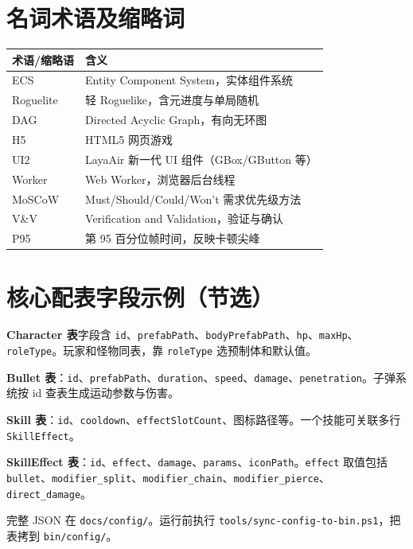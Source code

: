 \chapter{名词术语及缩略词}
\label{app:terms}

\begin{longtable}{ll}
  \toprule
  \textbf{术语/缩略语} & \textbf{含义} \\
  \midrule
  ECS & Entity Component System，实体组件系统 \\
  Roguelite & 轻 Roguelike，含元进度与单局随机 \\
  DAG & Directed Acyclic Graph，有向无环图 \\
  H5 & HTML5 网页游戏 \\
  UI2 & LayaAir 新一代 UI 组件（GBox/GButton 等） \\
  Worker & Web Worker，浏览器后台线程 \\
  MoSCoW & Must/Should/Could/Won't 需求优先级方法 \\
  V\&V & Verification and Validation，验证与确认 \\
  P95 & 第 95 百分位帧时间，反映卡顿尖峰 \\
  \bottomrule
\end{longtable}

\chapter{核心配表字段示例（节选）}
\label{app:config}

\textbf{Character 表}字段含 \texttt{id}、\texttt{prefabPath}、\texttt{bodyPrefabPath}、\texttt{hp}、\texttt{maxHp}、\texttt{roleType}。玩家和怪物同表，靠 \texttt{roleType} 选预制体和默认值。

\textbf{Bullet 表}：\texttt{id}、\texttt{prefabPath}、\texttt{duration}、\texttt{speed}、\texttt{damage}、\texttt{penetration}。子弹系统按 id 查表生成运动参数与伤害。

\textbf{Skill 表}：\texttt{id}、\texttt{cooldown}、\texttt{effectSlotCount}、图标路径等。一个技能可关联多行 \texttt{SkillEffect}。

\textbf{SkillEffect 表}：\texttt{id}、\texttt{effect}、\texttt{damage}、\texttt{params}、\texttt{iconPath}。\texttt{effect} 取值包括 \texttt{bullet}、\texttt{modifier\_split}、\texttt{modifier\_chain}、\texttt{modifier\_pierce}、\texttt{direct\_damage}。

完整 JSON 在 \texttt{docs/config/}。运行前执行 \texttt{tools/sync-config-to-bin.ps1}，把表拷到 \texttt{bin/config/}。

